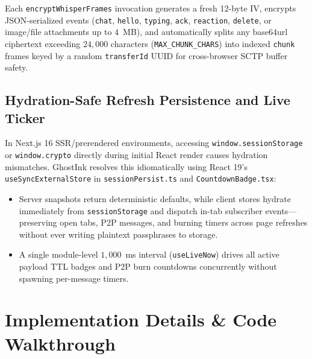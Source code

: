 \documentclass[12pt,a4paper,oneside,openany]{report}
\begin{document}
Each \texttt{encryptWhisperFrames} invocation generates a fresh 12-byte IV, encrypts JSON-serialized events (\texttt{chat}, \texttt{hello}, \texttt{typing}, \texttt{ack}, \texttt{reaction}, \texttt{delete}, or image/file attachments up to $4$~MB), and automatically splits any base64url ciphertext exceeding $24{,}000$ characters (\texttt{MAX\_CHUNK\_CHARS}) into indexed \texttt{chunk} frames keyed by a random \texttt{transferId} UUID for cross-browser SCTP buffer safety.

\section{Hydration-Safe Refresh Persistence and Live Ticker}
In Next.js 16 SSR/prerendered environments, accessing \texttt{window.sessionStorage} or \texttt{window.crypto} directly during initial React render causes hydration mismatches. GhostInk resolves this idiomatically using React 19's \texttt{useSyncExternalStore} in \texttt{sessionPersist.ts} and \texttt{CountdownBadge.tsx}:
\begin{itemize}
    \item Server snapshots return deterministic defaults, while client stores hydrate immediately from \texttt{sessionStorage} and dispatch in-tab subscriber events---preserving open tabs, P2P messages, and burning timers across page refreshes without ever writing plaintext passphrases to storage.
    \item A single module-level $1{,}000$~ms interval (\texttt{useLiveNow}) drives all active payload TTL badges and P2P burn countdowns concurrently without spawning per-message timers.
\end{itemize}

\chapter{Implementation Details \& Code Walkthrough}
\end{document}
